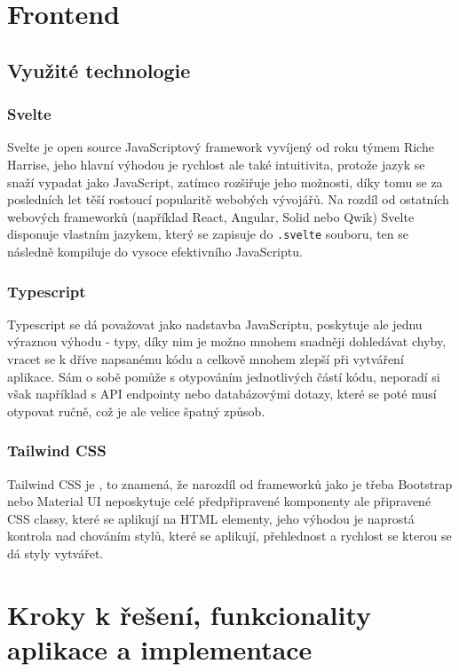 \documentclass[12pt, a4paper,
openright
]{report}
\begin{document}
\chapter{Frontend}

\section{Využité technologie}
\subsection{Svelte}
Svelte je open source JavaScriptový framework vyvíjený od roku týmem Riche Harrise, jeho hlavní výhodou je rychlost ale také intuitivita, protože jazyk se snaží vypadat jako JavaScript, zatímco rozšiřuje jeho možnosti, díky tomu se za posledních let těší rostoucí popularitě webobých vývojářů. Na rozdíl od ostatních webových frameworků (například React, Angular, Solid nebo Qwik) Svelte disponuje vlastním jazykem, který se zapisuje do \texttt{.svelte} souboru, ten se následně kompiluje do vysoce efektivního JavaScriptu.

\subsection{Typescript}
Typescript se dá považovat jako nadstavba JavaScriptu, poskytuje ale jednu výraznou výhodu - typy, díky nim je možno mnohem snadněji dohledávat chyby, vracet se k dříve napsanému kódu a celkově mnohem zlepší  při vytváření aplikace. Sám o sobě pomůže s otypováním jednotlivých částí kódu, neporadí si však například s API endpointy nebo databázovými dotazy, které se poté musí otypovat ručně, což je ale velice špatný způsob.

\subsection{Tailwind CSS}
Tailwind CSS je , to znamená, že narozdíl od frameworků jako je třeba Bootstrap nebo Material UI neposkytuje celé předpřipravené komponenty ale připravené CSS classy, které se aplikují na HTML elementy, jeho výhodou je naprostá kontrola nad chováním stylů, které se aplikují, přehlednost a rychlost se kterou se dá styly vytvářet.

\chapter{Kroky k řešení, funkcionality aplikace a implementace}
\end{document}
